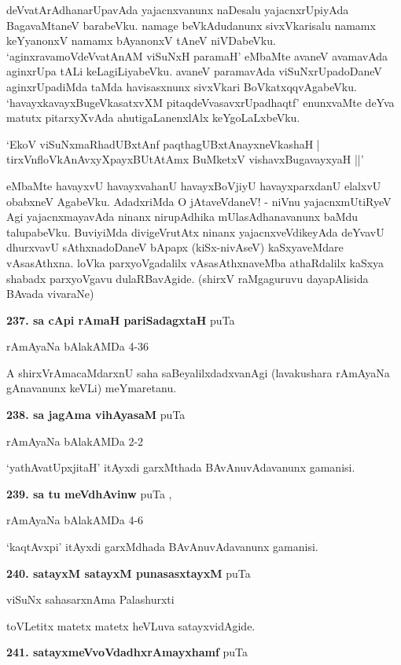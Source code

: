 deVvatArAdhanarUpavAda yajacnxvanunx naDesalu yajacnxrUpiyAda BagavaMtaneV barabeVku. namage beVkAdudanunx sivxVkarisalu namamx keYyanonxV namamx bAyanonxV tAneV niVDabeVku. `aginxravamoVdeVvatAnAM viSuNxH paramaH' eMbaMte avaneV avamavAda aginxrUpa tALi keLagiLiyabeVku. avaneV paramavAda viSuNxrUpadoDaneV aginxrUpadiMda taMda havisasxnunx sivxVkari BoVkatxqqvAgabeVku. `havayxkavayxBugeVkasatxvXM pitaqdeVvasavxrUpadhaqtf' enunxvaMte deYva matutx pitarxyXvAda ahutigaLanenxlAlx keYgoLaLxbeVku.

\begin{shloka}
`EkoV viSuNxmaRhadUBxtAnf paqthagUBxtAnayxneVkashaH |\\
tirxVnfloVkAnAvxyXpayxBUtAtAmx BuMketxV vishavxBugavayxyaH ||'
\end{shloka}
eMbaMte havayxvU havayxvahanU havayxBoVjiyU havayxparxdanU elalxvU obabxneV AgabeVku. AdadxriMda O jAtaveVdaneV! - niVnu yajacnxmUtiRyeV Agi yajacnxmayavAda ninanx nirupAdhika mUlasAdhanavanunx baMdu talupabeVku. BuviyiMda divigeVrutAtx ninanx yajacnxveVdikeyAda deYvavU dhurxvavU sAthxnadoDaneV bApapx (kiSx-nivAseV) kaSxyaveMdare vAsasAthxna. loVka parxyoVgadalilx vAsasAthxnaveMba athaRdalilx kaSxya shabadx parxyoVgavu dulaRBavAgide. (shirxV raMgaguruvu dayapAlisida BAvada vivaraNe)

\medskip
\noindent\textbf{237. sa cApi rAmaH pariSadagxtaH} \hfill puTa \pageref{168cc}

\hfill rAmAyaNa bAlakAMDa 4-36

A shirxVrAmacaMdarxnU saha saBeyalilxdadxvanAgi (lavakushara rAmAyaNa gAnavanunx keVLi) meYmaretanu.

\medskip
\noindent\textbf{238. sa jagAma vihAyasaM} \hfill puTa \pageref{163c}

\hfill rAmAyaNa bAlakAMDa 2-2

`yathAvatUpxjitaH' itAyxdi garxMthada BAvAnuvAdavanunx gamanisi.

\medskip
\noindent\textbf{239. sa tu meVdhAvinw} \hfill puTa \pageref{239},\pageref{240a}

\hfill rAmAyaNa bAlakAMDa 4-6

`kaqtAvxpi' itAyxdi garxMdhada BAvAnuvAdavanunx gamanisi.

\medskip
\noindent\textbf{240. satayxM satayxM punasasxtayxM} \hfill puTa \pageref{130a}

\hfill viSuNx sahasarxnAma Palashurxti

toVLetitx matetx matetx heVLuva satayxvidAgide.

\medskip
\noindent\textbf{241. satayxmeVvoVdadhxrAmayxhamf} \hfill puTa \pageref{40}

